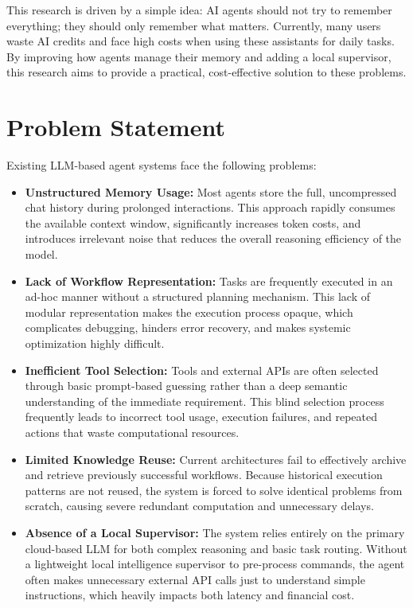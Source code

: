 This research is driven by a simple idea: AI agents should not try to remember everything; they should only remember what matters. Currently, many users waste AI credits and face high costs when using these assistants for daily tasks. By improving how agents manage their memory and adding a local supervisor, this research aims to provide a practical, cost-effective solution to these problems.\\

\section{Problem Statement}
Existing LLM-based agent systems face the following problems:\\
\begin{itemize}
\item \textbf{Unstructured Memory Usage:} Most agents store the full, uncompressed chat history during prolonged interactions. This approach rapidly consumes the available context window, significantly increases token costs, and introduces irrelevant noise that reduces the overall reasoning efficiency of the model\cite{ai_agent-memory}.
\item \textbf{Lack of Workflow Representation:} Tasks are frequently executed in an ad-hoc manner without a structured planning mechanism. This lack of modular representation makes the execution process opaque, which complicates debugging, hinders error recovery, and makes systemic optimization highly difficult.
\item \textbf{Inefficient Tool Selection:} Tools and external APIs are often selected through basic prompt-based guessing rather than a deep semantic understanding of the immediate requirement\cite{efficient_tool_select}. This blind selection process frequently leads to incorrect tool usage, execution failures, and repeated actions that waste computational resources.
\item \textbf{Limited Knowledge Reuse:} Current architectures fail to effectively archive and retrieve previously successful workflows. Because historical execution patterns are not reused, the system is forced to solve identical problems from scratch, causing severe redundant computation and unnecessary delays.
\item \textbf{Absence of a Local Supervisor:} The system relies entirely on the primary cloud-based LLM for both complex reasoning and basic task routing. Without a lightweight local intelligence supervisor to pre-process commands, the agent often makes unnecessary external API calls just to understand simple instructions, which heavily impacts both latency and financial cost.
\end{itemize}

